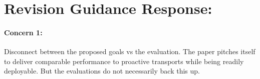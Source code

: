 \documentclass[12pt,one-column]{article}
\begin{document}
%
%
%
 

\setlength{\parskip}{0.1em}
\section{Revision Guidance Response: }
{\it \paragraph{Concern 1:} Disconnect between the proposed goals vs the evaluation. The paper pitches itself to deliver comparable performance to proactive transports while being readily deployable. But the evaluations do not necessarily back this up.  }
\end{document}
